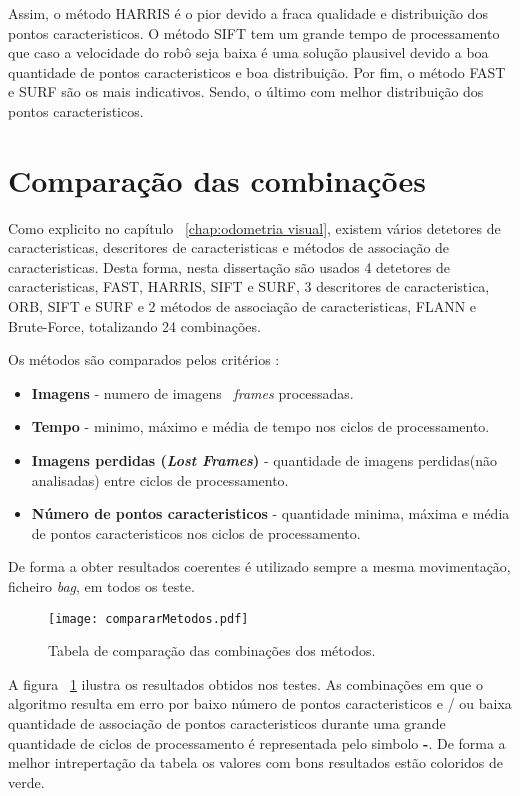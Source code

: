 Assim, o método HARRIS é o pior devido a fraca qualidade e distribuição dos pontos caracteristicos. O método SIFT tem um grande tempo de processamento que caso a velocidade do robô seja baixa é uma solução plausivel devido a boa quantidade de pontos caracteristicos e boa distribuição. Por fim, o método FAST e SURF são os mais indicativos. Sendo, o último com melhor distribuição  dos pontos caracteristicos. 


\section{Comparação das combinações}


Como explicito no capítulo ~\ref{chap:odometria visual}, existem vários detetores de caracteristicas, descritores de caracteristicas e métodos de associação de caracteristicas. Desta forma, nesta dissertação são usados 4 detetores de caracteristicas, FAST, HARRIS, SIFT e SURF, 3 descritores de caracteristica, ORB, SIFT e SURF e 2 métodos de associação de caracteristicas, FLANN e Brute-Force, totalizando 24 combinações.

Os métodos são comparados pelos critérios :
\begin{itemize}
	\item \textbf{Imagens} - numero de imagens \ \textit{frames} processadas.
	\item \textbf{Tempo} - minimo, máximo e média de tempo nos ciclos de processamento.
	\item \textbf{Imagens perdidas (\textit{Lost Frames})} - quantidade de imagens perdidas(não analisadas) entre ciclos de processamento.
	\item \textbf{Número de pontos caracteristicos} - quantidade minima, máxima e média de pontos caracteristicos nos ciclos de processamento.
\end{itemize}


De forma a obter resultados coerentes é utilizado sempre a mesma movimentação, ficheiro \textit{bag}, em todos os teste. 


\begin{figure}[h!] %
	\begin{center}
		\leavevmode		
		\texttt{[image: compararMetodos.pdf]}
		\caption{Tabela de comparação das combinações dos métodos.}
		\label{fig:compMet}
	\end{center}
\end{figure}


A figura ~\ref{fig:compMet} ilustra os resultados obtidos nos testes. As combinações em que  o algoritmo resulta em erro por baixo número de pontos caracteristicos e / ou baixa quantidade de associação de pontos caracteristicos durante uma grande quantidade de ciclos de processamento é representada pelo simbolo \textbf{-}. De forma a melhor intrepertação da tabela os valores com bons resultados estão coloridos de verde. 


